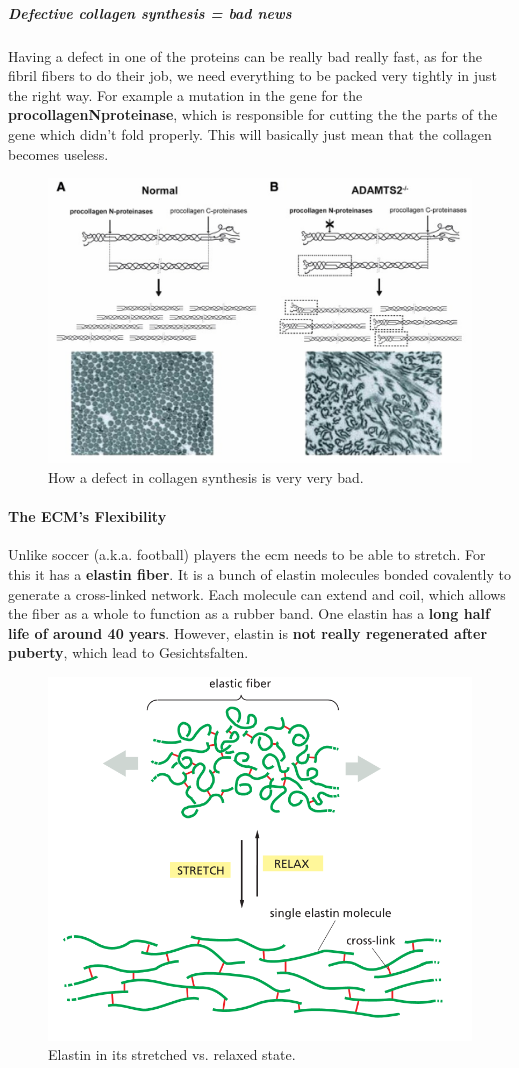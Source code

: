 \documentclass[../main.tex]{subfiles}
\begin{document}
\subparagraph{Defective collagen synthesis = bad news}

Having a defect in one of the proteins can be really bad really fast, as for the fibril fibers to do their job, we need everything to be packed very tightly in just the right way. For example a mutation in the gene for the \textbf{\gls{procollagenNproteinase}}, which is responsible for cutting the the parts of the gene which didn't fold properly. This will basically just mean that the collagen becomes useless.

\begin{figure}[H]
	\centering
	\includegraphics[width=0.6\linewidth]{coll_defe}
	\caption{How a defect in collagen synthesis is very very bad.}
	\label{fig:colldefe}
\end{figure}


\paragraph{The ECM's Flexibility}

Unlike soccer (a.k.a. football) players the ecm needs to be able to stretch. For this it has a \textbf{\gls{elastin} fiber}. It is a bunch of elastin molecules bonded covalently to generate a cross-linked network. Each molecule can extend and coil, which allows the fiber as a whole to function as a rubber band. One elastin has a \textbf{long half life of around 40 years}. However, elastin is \textbf{not really regenerated after puberty}, which lead to Gesichtsfalten. 

\begin{figure}[H]
	\centering
	\includegraphics[width=0.5\linewidth]{ela_over}
	\caption{Elastin in its stretched vs. relaxed state.}
	\label{fig:elaover}
\end{figure}
\end{document}
